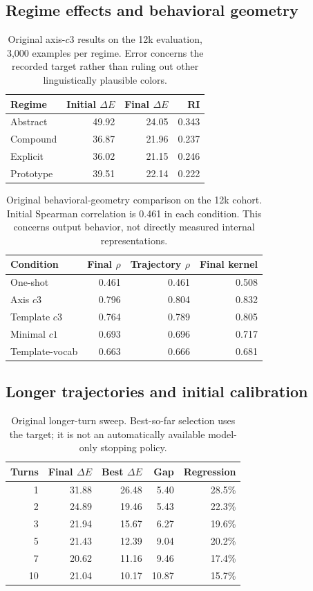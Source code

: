 \subsection{Regime effects and behavioral geometry}
\begin{table}[H]
\centering\small
\begin{tabular}{@{}lrrr@{}}
\toprule
Regime & Initial $\Delta E$ & Final $\Delta E$ & RI \\
\midrule
Abstract & 49.92 & 24.05 & 0.343 \\
Compound & 36.87 & 21.96 & 0.237 \\
Explicit & 36.02 & 21.15 & 0.246 \\
Prototype & 39.51 & 22.14 & 0.222 \\
\bottomrule
\end{tabular}
\caption{Original axis-$c3$ results on the 12k evaluation, 3{,}000 examples
per regime. Error concerns the recorded target rather than ruling out
other linguistically plausible colors.}
\end{table}

\begin{table}[H]
\centering\small
\begin{tabular}{@{}lrrr@{}}
\toprule
Condition & Final $\rho$ & Trajectory $\rho$ & Final kernel \\
\midrule
One-shot & 0.461 & 0.461 & 0.508 \\
Axis $c3$ & 0.796 & 0.804 & 0.832 \\
Template $c3$ & 0.764 & 0.789 & 0.805 \\
Minimal $c1$ & 0.693 & 0.696 & 0.717 \\
Template-vocab & 0.663 & 0.666 & 0.681 \\
\bottomrule
\end{tabular}
\caption{Original behavioral-geometry comparison on the 12k cohort.
Initial Spearman correlation is 0.461 in each condition. This concerns
output behavior, not directly measured internal representations.}
\end{table}

\subsection{Longer trajectories and initial calibration}
\begin{table}[H]
\centering\small
\begin{tabular}{@{}rrrrr@{}}
\toprule
Turns & Final $\Delta E$ & Best $\Delta E$ & Gap & Regression \\
\midrule
1 & 31.88 & 26.48 & 5.40 & 28.5\% \\
2 & 24.89 & 19.46 & 5.43 & 22.3\% \\
3 & 21.94 & 15.67 & 6.27 & 19.6\% \\
5 & 21.43 & 12.39 & 9.04 & 20.2\% \\
7 & 20.62 & 11.16 & 9.46 & 17.4\% \\
10 & 21.04 & 10.17 & 10.87 & 15.7\% \\
\bottomrule
\end{tabular}
\caption{Original longer-turn sweep. Best-so-far selection uses the target;
it is not an automatically available model-only stopping policy.}
\end{table}

